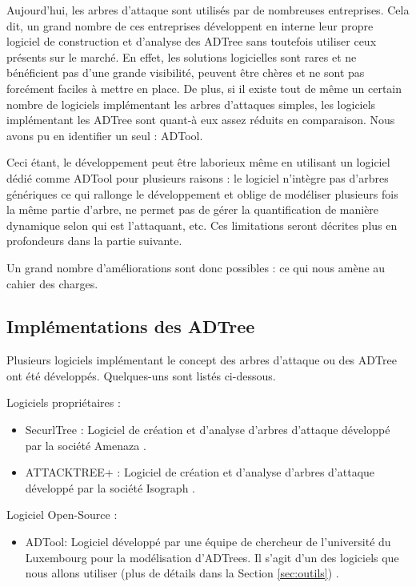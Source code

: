         Aujourd'hui, les arbres d'attaque sont utilisés par de nombreuses entreprises. Cela dit, un grand nombre de ces entreprises développent en interne leur propre logiciel de construction et d'analyse des ADTree sans toutefois utiliser ceux présents sur le marché. En effet, les solutions logicielles sont rares et ne bénéficient pas d'une grande visibilité, peuvent être chères et ne sont pas forcément faciles à mettre en place. De plus, si il existe tout de même un certain nombre de logiciels implémentant les arbres d'attaques simples, les logiciels implémentant les ADTree sont quant-à eux assez réduits en comparaison. Nous avons pu en identifier un seul : ADTool. 

        Ceci étant, le développement peut être laborieux même en utilisant un logiciel dédié comme ADTool pour plusieurs raisons : le logiciel n’intègre pas d'arbres génériques ce qui rallonge le développement et oblige de modéliser plusieurs fois la même partie d'arbre, ne permet pas de gérer la quantification de manière dynamique selon qui est l'attaquant, etc. Ces limitations seront décrites plus en profondeurs dans la partie suivante.

        Un grand nombre d'améliorations sont donc possibles : ce qui nous amène au cahier des charges.


    \subsection{Implémentations des ADTree}
        Plusieurs logiciels implémentant le concept des arbres d'attaque ou des ADTree ont été développés. Quelques-uns sont listés ci-dessous.
        
        Logiciels propriétaires :
        \begin{itemize}
            \item SecurlTree : Logiciel de création et d'analyse d'arbres d'attaque développé par la société Amenaza \cite{SecurlTree}.
            \item ATTACKTREE+ : Logiciel de création et d'analyse d'arbres d'attaque développé par la société Isograph \cite{ATTACKTREE+}.
        \end{itemize}
        
        Logiciel Open-Source :
        \begin{itemize}
            \item ADTool: Logiciel développé par une équipe de chercheur de l'université du Luxembourg pour la modélisation d'ADTrees. Il s'agit d'un des logiciels que nous allons utiliser (plus de détails dans la Section \ref{sec:outils}) \cite{ADTool}.
        \end{itemize}